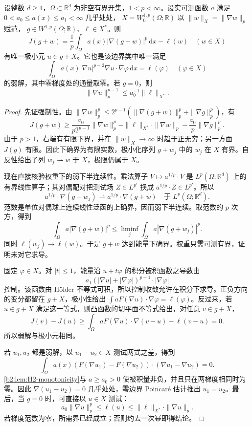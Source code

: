 \begin{theorem}
\label{b2:thm:H2-variational}
设整数 \(d\ge1\)，\(\Omega\subset\mathbb R^d\) 为非空有界开集，\(1<p<\infty\)。设实可测函数 \(a\) 满足
\(0<a_0\le a(x)\le a_1<\infty\) 几乎处处，
\(X=W_0^{1,p}(\Omega;\mathbb R)\) 以 \(\|w\|_X=\|\nabla w\|_p\) 赋范，
\(g\in W^{1,p}(\Omega;\mathbb R)\)、\(\ell\in X^*\)。则
\[
 J(g+w)=\frac1p\int_\Omega a(x)|\nabla(g+w)|^p\,\mathrm dx-\ell(w)
 \quad(w\in X)
\]
有唯一极小元 \(u\in g+X\)。它也是该边界类中唯一满足
\[
 \int_\Omega a(x)|\nabla u|^{p-2}\nabla u\cdot\nabla\varphi\,\mathrm dx
   =\ell(\varphi)\quad(\varphi\in X)
\]
的弱解，其中零梯度处的通量取零。若 \(g=0\)，则
\[
 \|\nabla u\|_p^{p-1}\le a_0^{-1}\|\ell\|_{X^*}.
\]
\end{theorem}
\begin{proof}
先证强制性。由
\(\|\nabla w\|_p^p\le2^{p-1}(\|\nabla(g+w)\|_p^p+\|\nabla g\|_p^p)\)，有
\[
 J(g+w)\ge\frac{a_0}{p2^{p-1}}\|\nabla w\|_p^p
       -\|\ell\|_{X^*}\cdot\|\nabla w\|_p
       -\frac{a_0}{p}\|\nabla g\|_p^p.
\]
由于 \(p>1\)，右端有有限下界，并在 \(\|w\|_X\to\infty\) 时趋于正无穷；另一方面 \(J(g)\) 有限。因此下确界为有限实数，极小化序列 \(g+w_j\) 中的 \(w_j\) 在 \(X\) 有界。自反性给出子列 \(w_j\rightharpoonup w\) 于 \(X\)，极限仍属于 \(X\)。

现在直接核验权重下的弱下半连续性。乘法算子
\(V\mapsto a^{1/p}\cdot V\) 是 \(L^p(\Omega;\mathbb R^d)\) 上的有界线性算子；其对偶配对把测试场 \(Z\in L^{p'}\) 换成 \(a^{1/p}\cdot Z\in L^{p'}\)。所以
\[
 a^{1/p}\cdot\nabla(g+w_j)
 \rightharpoonup a^{1/p}\cdot\nabla(g+w)
 \quad\text{于 }L^p(\Omega;\mathbb R^d).
\]
范数是单位对偶球上连续线性泛函的上确界，因而弱下半连续。取范数的 \(p\) 次方，得到
\[
 \int_\Omega a|\nabla(g+w)|^p
 \le\liminf_j\int_\Omega a|\nabla(g+w_j)|^p.
\]
同时 \(\ell(w_j)\to\ell(w)\)。于是 \(g+w\) 达到能量下确界。权重只需可测有界，证明未对它求导。

固定 \(\varphi\in X\)。对 \(|t|\le1\)，能量沿 \(u+t\varphi\) 的积分被积函数之导数由
\[
 a_1(|\nabla u|+|\nabla\varphi|)^{p-1}\cdot|\nabla\varphi|
\]
控制。该函数由 Hölder 不等式可积，所以控制收敛允许在积分下求导。正负方向的变分都留在 \(g+X\)，极小性给出
\(\int aF(\nabla u)\cdot\nabla\varphi=\ell(\varphi)\)。反过来，若 \(u\in g+X\) 满足这一等式，则凸函数的切平面不等式给出，对任意 \(v\in g+X\)，
\[
 J(v)-J(u)
 \ge\int_\Omega aF(\nabla u)\cdot\nabla(v-u)-\ell(v-u)=0.
\]
所以弱解与极小元相同。

若 \(u_1,u_2\) 都是弱解，以 \(u_1-u_2\in X\) 测试两式之差，得到
\[
 \int_\Omega a(x)
   (F(\nabla u_1)-F(\nabla u_2))\cdot(\nabla u_1-\nabla u_2)=0.
\]
\cref{b2:lem:H2-monotonicity}与 \(a\ge a_0>0\) 使被积量非负，并且只在两梯度相同时为零。因此 \(\nabla(u_1-u_2)=0\) 几乎处处，零边界 Poincaré 估计推出 \(u_1=u_2\)。最后，当 \(g=0\) 时，可直接以 \(u\in X\) 测试：
\[
 a_0\|\nabla u\|_p^p
 \le\ell(u)\le\|\ell\|_{X^*}\cdot\|\nabla u\|_p.
\]
若梯度范数为零，所需界已经成立；否则约去一次幂即得结论。
\end{proof}

